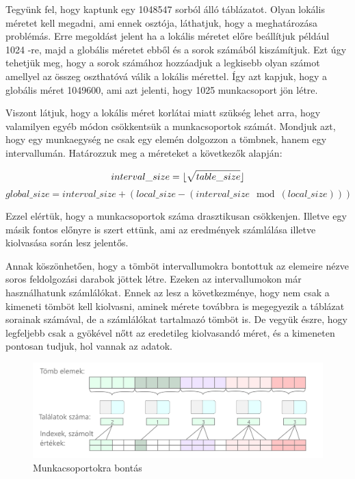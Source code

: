 Tegyünk fel, hogy kaptunk egy 1048547 sorból álló táblázatot.
Olyan lokális méretet kell megadni, ami ennek osztója, láthatjuk, hogy a meghatározása problémás.
Erre megoldást jelent ha a lokális méretet előre beállítjuk például 1024 -re, majd a globális méretet ebből és a sorok számából kiszámítjuk.
Ezt úgy tehetjük meg, hogy a sorok számához hozzáadjuk a legkisebb olyan számot amellyel az összeg oszthatóvá válik a lokális mérettel.
Így azt kapjuk, hogy a globális méret 1049600, ami azt jelenti, hogy 1025 munkacsoport jön létre. 

Viszont látjuk, hogy a lokális méret korlátai miatt szükség lehet arra, hogy valamilyen egyéb módon csökkentsük a munkacsoportok számát.
Mondjuk azt, hogy egy munkaegység ne csak egy elemén dolgozzon a tömbnek, hanem egy intervallumán.
Határozzuk meg a méreteket a következők alapján:

$$ interval\_size = \lfloor \sqrt{table\_size} \rfloor $$
$$global\_size = interval\_size + ( local\_size - (interval\_size\mod(local\_size)) )$$

Ezzel elértük, hogy a munkacsoportok száma drasztikusan csökkenjen. Illetve egy másik fontos előnyre is szert ettünk, ami az eredmények számlálása illetve kiolvasása során lesz jelentős.


Annak köszönhetően, hogy a tömböt intervallumokra bontottuk az elemeire nézve soros feldolgozási darabok jöttek létre. Ezeken az intervallumokon már 
használhatunk számlálókat. Ennek az lesz a következménye, hogy nem csak a kimeneti tömböt kell kiolvasni, aminek mérete továbbra is megegyezik a táblázat sorainak számával, de a számlálókat tartalmazó tömböt is.
De vegyük észre, hogy legfeljebb csak a gyökével nőtt az eredetileg kiolvasandó méret, és a kimeneten pontosan tudjuk, hol vannak az adatok.

\begin{figure}[h!]
\centering
\includegraphics[width=\textwidth]{images/itemgroup.png}
\caption{Munkacsoportokra bontás}
\label{fig:opencl}
\end{figure}

